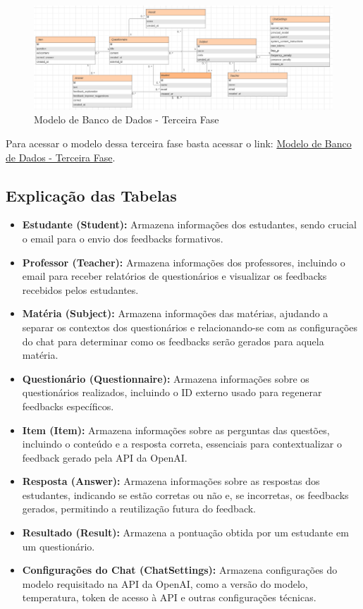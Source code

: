 \begin{figure}[H]
    \centering
    \includegraphics[width=1\textwidth]{figuras/bd-phase3.png}
    \caption{Modelo de Banco de Dados - Terceira Fase}
    \label{fig:third_phase}
\end{figure}

Para acessar o modelo dessa terceira fase basta acessar o link: \href{https://lucid.app/lucidchart/c1e592ab-3b4a-4bba-9849-cc3237f4fa76/edit?viewport_loc=-2447%2C-1073%2C2164%2C956%2C0_0&invitationId=inv_fbaaf515-3973-4d6a-9359-eb0dc4a26eee}{Modelo de Banco de Dados - Terceira Fase}.

\subsection{Explicação das Tabelas}

\begin{itemize}
    \item \textbf{Estudante (Student):} Armazena informações dos estudantes, sendo crucial o email para o envio dos feedbacks formativos.
    \item \textbf{Professor (Teacher):} Armazena informações dos professores, incluindo o email para receber relatórios de questionários e visualizar os feedbacks recebidos pelos estudantes.
    \item \textbf{Matéria (Subject):} Armazena informações das matérias, ajudando a separar os contextos dos questionários e relacionando-se com as configurações do chat para determinar como os feedbacks serão gerados para aquela matéria.
    \item \textbf{Questionário (Questionnaire):} Armazena informações sobre os questionários realizados, incluindo o ID externo usado para regenerar feedbacks específicos.
    \item \textbf{Item (Item):} Armazena informações sobre as perguntas das questões, incluindo o conteúdo e a resposta correta, essenciais para contextualizar o feedback gerado pela API da OpenAI.
    \item \textbf{Resposta (Answer):} Armazena informações sobre as respostas dos estudantes, indicando se estão corretas ou não e, se incorretas, os feedbacks gerados, permitindo a reutilização futura do feedback.
    \item \textbf{Resultado (Result):} Armazena a pontuação obtida por um estudante em um questionário.
    \item \textbf{Configurações do Chat (ChatSettings):} Armazena configurações do modelo requisitado na API da OpenAI, como a versão do modelo, temperatura, token de acesso à API e outras configurações técnicas.
\end{itemize}

